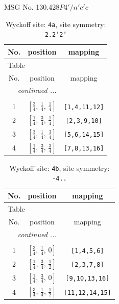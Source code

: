 \documentclass[fleqn,8pt]{jsarticle}
\begin{document}
\setcounter{MaxMatrixCols}{32}

\renewcommand{\tablename}{Table~}
\renewcommand{\figurename}{Figure~}
\begin{center}
\LARGE
MSG No. 130.428\quad$P4'/n'c'c$
\end{center}
\renewcommand{\arraystretch}{1.2}
\begin{longtable}{ccc}
\caption{Wyckoff site: {\tt 4a}, site symmetry: {\tt 2.2'2'}}
 \\
 \hline \hline
No. & position & mapping \\ \hline \endfirsthead

\multicolumn{2}{l}{\tablename\ \thetable{}} \\
 \hline \hline
No. & position & mapping \\ \hline \endhead

 \hline \hline
\multicolumn{2}{r}{\footnotesize\it continued ...} \\ \endfoot

 \hline \hline
\multicolumn{2}{r}{} \\ \endlastfoot

1 & $\left[ \frac{3}{4},\, \frac{1}{4},\, \frac{1}{4} \right]$ & {\tt [1,4,11,12]} \\ \hline
2 & $\left[ \frac{1}{4},\, \frac{3}{4},\, \frac{1}{4} \right]$ & {\tt [2,3,9,10]} \\ \hline
3 & $\left[ \frac{3}{4},\, \frac{1}{4},\, \frac{3}{4} \right]$ & {\tt [5,6,14,15]} \\ \hline
4 & $\left[ \frac{1}{4},\, \frac{3}{4},\, \frac{3}{4} \right]$ & {\tt [7,8,13,16]} \\
\end{longtable}
\renewcommand{\arraystretch}{1.2}
\begin{longtable}{ccc}
\caption{Wyckoff site: {\tt 4b}, site symmetry: {\tt -4..}}
 \\
 \hline \hline
No. & position & mapping \\ \hline \endfirsthead

\multicolumn{2}{l}{\tablename\ \thetable{}} \\
 \hline \hline
No. & position & mapping \\ \hline \endhead

 \hline \hline
\multicolumn{2}{r}{\footnotesize\it continued ...} \\ \endfoot

 \hline \hline
\multicolumn{2}{r}{} \\ \endlastfoot

1 & $\left[ \frac{3}{4},\, \frac{1}{4},\, 0 \right]$ & {\tt [1,4,5,6]} \\ \hline
2 & $\left[ \frac{1}{4},\, \frac{3}{4},\, \frac{1}{2} \right]$ & {\tt [2,3,7,8]} \\ \hline
3 & $\left[ \frac{1}{4},\, \frac{3}{4},\, 0 \right]$ & {\tt [9,10,13,16]} \\ \hline
4 & $\left[ \frac{3}{4},\, \frac{1}{4},\, \frac{1}{2} \right]$ & {\tt [11,12,14,15]} \\
\end{longtable}
\end{document}
